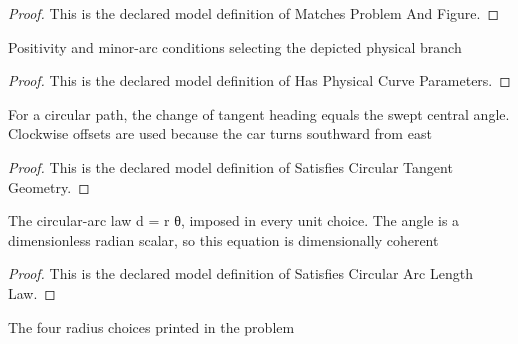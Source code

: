 \begin{proof}
  This is the declared model definition of Matches Problem And Figure.
\end{proof}
\begin{definition}
  \label{def:physics:phyx-mini-0667:phyxminiproblems-problemphyxmini0667-hasphysicalcurveparameters}
  Positivity and minor-arc conditions selecting the depicted physical branch
\end{definition}
\begin{proof}
  This is the declared model definition of Has Physical Curve Parameters.
\end{proof}
\begin{definition}
  \label{def:physics:phyx-mini-0667:phyxminiproblems-problemphyxmini0667-satisfiescirculartangentgeometry}
  For a circular path, the change of tangent heading equals the swept central angle. Clockwise offsets are used because the car turns southward from east
\end{definition}
\begin{proof}
  This is the declared model definition of Satisfies Circular Tangent Geometry.
\end{proof}
\begin{definition}
  \label{def:physics:phyx-mini-0667:phyxminiproblems-problemphyxmini0667-satisfiescirculararclengthlaw}
  The circular-arc law d = r θ, imposed in every unit choice. The angle is a dimensionless radian scalar, so this equation is dimensionally coherent
\end{definition}
\begin{proof}
  This is the declared model definition of Satisfies Circular Arc Length Law.
\end{proof}
\begin{definition}
  \label{def:physics:phyx-mini-0667:phyxminiproblems-problemphyxmini0667-answerchoice}
  The four radius choices printed in the problem
\end{definition}
